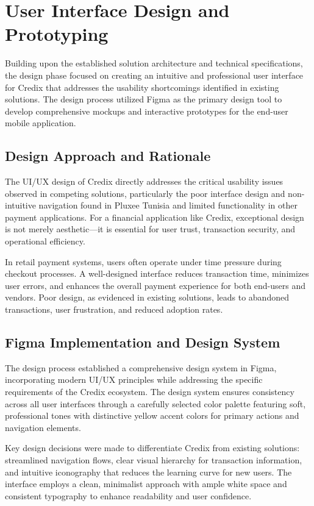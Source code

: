 \section{User Interface Design and Prototyping}

Building upon the established solution architecture and technical specifications, the design phase focused on creating an intuitive and professional user interface for Credix that addresses the usability shortcomings identified in existing solutions. The design process utilized Figma as the primary design tool to develop comprehensive mockups and interactive prototypes for the end-user mobile application.

\subsection{Design Approach and Rationale}

The UI/UX design of Credix directly addresses the critical usability issues observed in competing solutions, particularly the poor interface design and non-intuitive navigation found in Pluxee Tunisia and limited functionality in other payment applications. For a financial application like Credix, exceptional design is not merely aesthetic—it is essential for user trust, transaction security, and operational efficiency.

In retail payment systems, users often operate under time pressure during checkout processes. A well-designed interface reduces transaction time, minimizes user errors, and enhances the overall payment experience for both end-users and vendors. Poor design, as evidenced in existing solutions, leads to abandoned transactions, user frustration, and reduced adoption rates.

\subsection{Figma Implementation and Design System}

The design process established a comprehensive design system in Figma, incorporating modern UI/UX principles while addressing the specific requirements of the Credix ecosystem. The design system ensures consistency across all user interfaces through a carefully selected color palette featuring soft, professional tones with distinctive yellow accent colors for primary actions and navigation elements.

Key design decisions were made to differentiate Credix from existing solutions: streamlined navigation flows, clear visual hierarchy for transaction information, and intuitive iconography that reduces the learning curve for new users. The interface employs a clean, minimalist approach with ample white space and consistent typography to enhance readability and user confidence.

